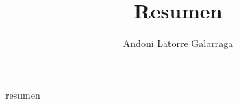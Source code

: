 \documentclass{article}
\title{Resumen}
\author{Andoni Latorre Galarraga}
\date{}
\begin{document}
\maketitle
resumen
\end{document}
